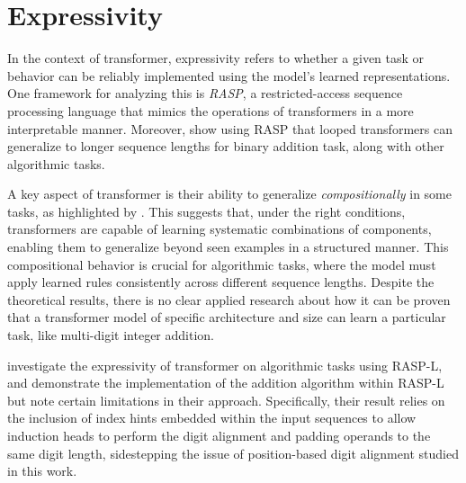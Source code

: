 \section{Expressivity}\label{sec:expressivity}

In the context of transformer, expressivity refers to whether a given task or behavior can be reliably implemented using the model's learned representations. One framework for analyzing this is \emph{RASP}, a restricted-access sequence processing language \parencite{weiss_thinking_2021} that mimics the operations of transformers in a more interpretable manner. Moreover, \cite{fan_looped_2024} show using RASP that looped transformers can generalize to longer sequence lengths for binary addition task, along with other algorithmic tasks.

A key aspect of transformer is their ability to generalize \emph{compositionally} in some tasks, as highlighted by \cite{hupkes_compositionality_2020}. This suggests that, under the right conditions, transformers are capable of learning systematic combinations of components, enabling them to generalize beyond seen examples in a structured manner. This compositional behavior is crucial for algorithmic tasks, where the model must apply learned rules consistently across different sequence lengths. Despite the theoretical results, there is no clear applied research about how it can be proven that a transformer model of specific architecture and size can learn a particular task, like multi-digit integer addition.

\cite{zhou_what_2023} investigate the expressivity of transformer on algorithmic tasks using RASP-L, and demonstrate the implementation of the addition algorithm within RASP-L but note certain limitations in their approach. Specifically, their result relies on the inclusion of index hints embedded within the input sequences to allow induction heads to perform the digit alignment and padding operands to the same digit length, sidestepping the issue of position-based digit alignment studied in this work.